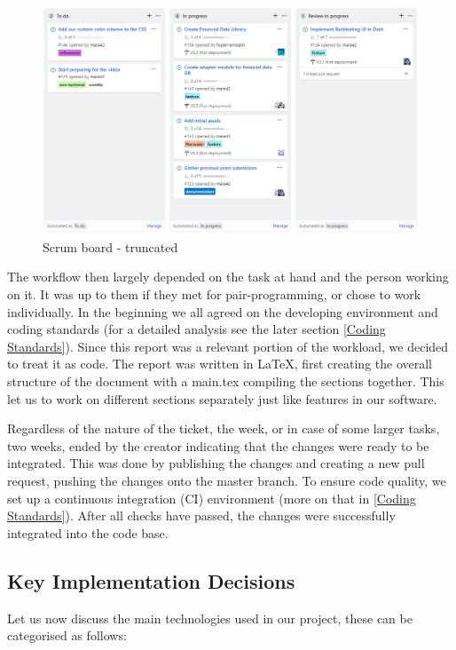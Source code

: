 \documentclass[main.tex]{subfiles}
\begin{document}
\begin{figure}[H]
   \centering
   \includegraphics[width=\textwidth]{05Coding/05Pictures/scrumboard.png}
   \caption{Scrum board - truncated}
   \label{Scrum}
\end{figure}

The workflow then largely depended on the task at hand and the person working on it. It was up to them if they met for pair-programming, or chose to work individually. In the beginning we all agreed on the developing environment and coding standards (for a detailed analysis see the later section \ref{Coding Standards}). Since this report was a relevant portion of the workload, we decided to treat it as code. The report was written in \LaTeX, first creating the overall structure of the document with a main.tex compiling the sections together. This let us to work on different sections separately just like features in our software.

Regardless of the nature of the ticket, the week, or in case of some larger tasks, two weeks, ended by the creator indicating that the changes were ready to be integrated. This was done by publishing the changes and creating a new pull request, pushing the changes onto the master branch. To ensure code quality, we set up a continuous integration (CI) environment (more on that in \ref{Coding Standards}). After all checks have passed, the changes were successfully integrated into the code base.

\subsection{Key Implementation Decisions}

Let us now discuss the main technologies used in our project, these can be categorised as follows:
\end{document}

